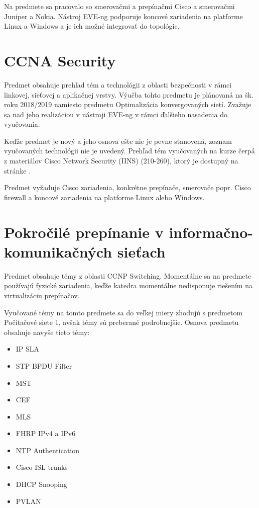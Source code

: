 Na predmete sa pracovalo so smerovačmi a prepínačmi Cisco a smerovačmi Juniper a Nokia. Nástroj EVE-ng podporuje koncové zariadenia na platforme Linux a Windows a je ich možné integrovať do topológie.




\section{CCNA Security}
  
Predmet obsahuje prehľad tém a technológii z oblasti bezpečnosti v rámci linkovej, sieťovej a aplikačnej vrstvy. Výučba tohto predmetu je plánovaná na šk. roku 2018/2019 namiesto predmetu Optimalizácia konvergovaných sietí. Zvažuje sa nad jeho realizáciou v nástroji EVE-ng v rámci ďalšieho nasadenia do vyučovania.

Keďže predmet je nový a jeho osnova ešte nie je pevne stanovená, zoznam vyučovaných technológii nie je uvedený. Prehľad tém vyučovaných na kurze čerpá z materiálov Cisco Network Security (IINS) (210-260), ktorý je dostupný na stránke \cite{ccna_security_topics}.

Predmet vyžaduje Cisco zariadenia, konkrétne prepínače, smerovače popr. Cisco firewall a koncové zariadenia na platforme Linux alebo Windows.





\section{Pokročilé prepínanie v informačno-komunikačných sieťach}

Predmet obsahuje témy z oblasti CCNP Switching. Momentálne sa na predmete používajú fyzické zariadenia, keďže katedra momentálne nedisponuje riešením na virtualizáciu prepínačov.

Vyučované témy na tomto predmete sa do veľkej miery zhodujú s predmetom Počítačové siete 1, avšak témy sú preberané podrobnejšie. Osnova predmetu obsahuje navyše tieto témy:

\begin{itemize}[noitemsep]
    \item IP SLA
    \item STP BPDU Filter
    \item MST
    \item CEF
    \item MLS
    \item FHRP IPv4 a IPv6 
    \item NTP Authentication
    \item Cisco ISL trunks
    \item DHCP Snooping
    \item PVLAN
\end{itemize}

